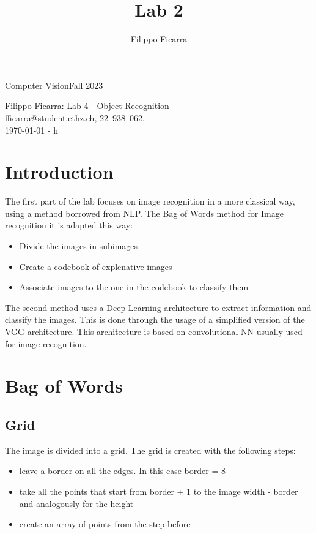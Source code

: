 \documentclass{ETHExercise}
\title{Lab 2}
\author{Filippo Ficarra}
\newcommand{\timestamp}{\ddmmyyyydate\today \,\,- \currenttime h}
\begin{document}
{}
{\Large Computer Vision}{Fall 2023}
\begin{center}
    {\Huge Filippo Ficarra: Lab 4 - Object Recognition}\\
      \quad\newline
      fficarra@student.ethz.ch, 22--938--062.\\
      \quad\newline
      \timestamp
      \end{center}

\section{Introduction}
The first part of the lab focuses on image recognition in a more 
classical way, using a method borrowed from NLP. The Bag of Words method for Image recognition it is adapted this way:
\begin{itemize}
  \item Divide the images in subimages 
  \item Create a codebook of explenative images
  \item Associate images to the one in the codebook to classify them
\end{itemize}

The second method uses a Deep Learning architecture to extract information
and classify the images. This is done through the usage of a simplified
version of the VGG architecture. This architecture is based on convolutional NN 
usually used for image recognition.

\section{Bag of Words}
\subsection{Grid}
The image is divided into a grid. The grid is created with the 
following steps:
\begin{itemize}
  \item leave a border on all the edges. In this case border = 8
  \item take all the points that start from border + 1 to the image width - border and analogously for the height
  \item create an array of points from the step before
\end{itemize}
\end{document}

